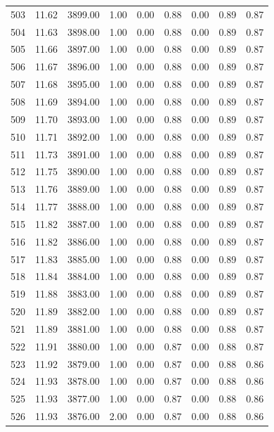 \documentclass{article}\usepackage[]{graphicx}\usepackage[]{color}
\begin{document}
\begin{longtable}{rrrrrrrrr}
  503 & 11.62 & 3899.00 & 1.00 & 0.00 & 0.88 & 0.00 & 0.89 & 0.87 \\ 
  504 & 11.63 & 3898.00 & 1.00 & 0.00 & 0.88 & 0.00 & 0.89 & 0.87 \\ 
  505 & 11.66 & 3897.00 & 1.00 & 0.00 & 0.88 & 0.00 & 0.89 & 0.87 \\ 
  506 & 11.67 & 3896.00 & 1.00 & 0.00 & 0.88 & 0.00 & 0.89 & 0.87 \\ 
  507 & 11.68 & 3895.00 & 1.00 & 0.00 & 0.88 & 0.00 & 0.89 & 0.87 \\ 
  508 & 11.69 & 3894.00 & 1.00 & 0.00 & 0.88 & 0.00 & 0.89 & 0.87 \\ 
  509 & 11.70 & 3893.00 & 1.00 & 0.00 & 0.88 & 0.00 & 0.89 & 0.87 \\ 
  510 & 11.71 & 3892.00 & 1.00 & 0.00 & 0.88 & 0.00 & 0.89 & 0.87 \\ 
  511 & 11.73 & 3891.00 & 1.00 & 0.00 & 0.88 & 0.00 & 0.89 & 0.87 \\ 
  512 & 11.75 & 3890.00 & 1.00 & 0.00 & 0.88 & 0.00 & 0.89 & 0.87 \\ 
  513 & 11.76 & 3889.00 & 1.00 & 0.00 & 0.88 & 0.00 & 0.89 & 0.87 \\ 
  514 & 11.77 & 3888.00 & 1.00 & 0.00 & 0.88 & 0.00 & 0.89 & 0.87 \\ 
  515 & 11.82 & 3887.00 & 1.00 & 0.00 & 0.88 & 0.00 & 0.89 & 0.87 \\ 
  516 & 11.82 & 3886.00 & 1.00 & 0.00 & 0.88 & 0.00 & 0.89 & 0.87 \\ 
  517 & 11.83 & 3885.00 & 1.00 & 0.00 & 0.88 & 0.00 & 0.89 & 0.87 \\ 
  518 & 11.84 & 3884.00 & 1.00 & 0.00 & 0.88 & 0.00 & 0.89 & 0.87 \\ 
  519 & 11.88 & 3883.00 & 1.00 & 0.00 & 0.88 & 0.00 & 0.89 & 0.87 \\ 
  520 & 11.89 & 3882.00 & 1.00 & 0.00 & 0.88 & 0.00 & 0.89 & 0.87 \\ 
  521 & 11.89 & 3881.00 & 1.00 & 0.00 & 0.88 & 0.00 & 0.88 & 0.87 \\ 
  522 & 11.91 & 3880.00 & 1.00 & 0.00 & 0.87 & 0.00 & 0.88 & 0.87 \\ 
  523 & 11.92 & 3879.00 & 1.00 & 0.00 & 0.87 & 0.00 & 0.88 & 0.86 \\ 
  524 & 11.93 & 3878.00 & 1.00 & 0.00 & 0.87 & 0.00 & 0.88 & 0.86 \\ 
  525 & 11.93 & 3877.00 & 1.00 & 0.00 & 0.87 & 0.00 & 0.88 & 0.86 \\ 
  526 & 11.93 & 3876.00 & 2.00 & 0.00 & 0.87 & 0.00 & 0.88 & 0.86 \\ 

\end{longtable}
\end{document}
